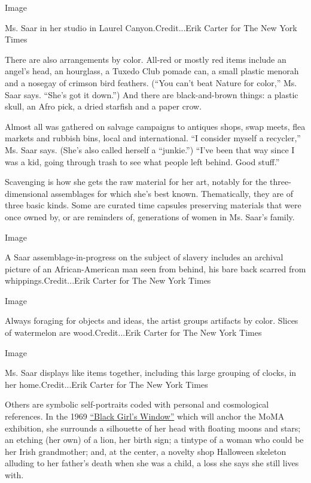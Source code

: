 Image

Ms. Saar in her studio in Laurel Canyon.Credit...Erik Carter for The New
York Times

There are also arrangements by color. All-red or mostly red items
include an angel's head, an hourglass, a Tuxedo Club pomade can, a small
plastic menorah and a nosegay of crimson bird feathers. (``You can't
beat Nature for color,'' Ms. Saar says. ``She's got it down.'') And
there are black-and-brown things: a plastic skull, an Afro pick, a dried
starfish and a paper crow.

Almost all was gathered on salvage campaigns to antiques shops, swap
meets, flea markets and rubbish bins, local and international. ``I
consider myself a recycler,'' Ms. Saar says. (She's also called herself
a ``junkie.'') ``I've been that way since I was a kid, going through
trash to see what people left behind. Good stuff.''

Scavenging is how she gets the raw material for her art, notably for the
three-dimensional assemblages for which she's best known. Thematically,
they are of three basic kinds. Some are curated time capsules preserving
materials that were once owned by, or are reminders of, generations of
women in Ms. Saar's family.

Image

A Saar assemblage-in-progress on the subject of slavery includes an
archival picture of an African-American man seen from behind, his bare
back scarred from whippings.Credit...Erik Carter for The New York Times

Image

Always foraging for objects and ideas, the artist groups artifacts by
color. Slices of watermelon are wood.Credit...Erik Carter for The New
York Times

Image

Ms. Saar displays like items together, including this large grouping of
clocks, in her home.Credit...Erik Carter for The New York Times

Others are symbolic self-portraits coded with personal and cosmological
references. In the 1969
\href{https://www.moma.org/audio/playlist/26/539}{``Black Girl's
Window''} which will anchor the MoMA exhibition, she surrounds a
silhouette of her head with floating moons and stars; an etching (her
own) of a lion, her birth sign; a tintype of a woman who could be her
Irish grandmother; and, at the center, a novelty shop Halloween skeleton
alluding to her father's death when she was a child, a loss she says she
still lives with.

